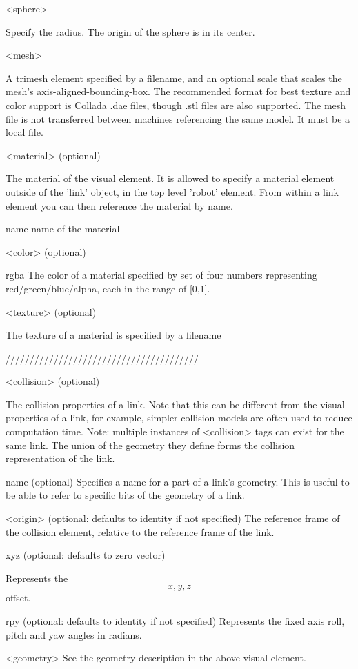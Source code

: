         <sphere>

            Specify the radius. The origin of the sphere is in its center. 

        <mesh>

            A trimesh element specified by a filename, and an optional scale that scales the mesh's axis-aligned-bounding-box. The recommended format for best texture and color support is Collada .dae files, though .stl files are also supported. The mesh file is not transferred between machines referencing the same model. It must be a local file. 

<material> (optional)

    The material of the visual element. It is allowed to specify a material element outside of the 'link' object, in the top level 'robot' element. From within a link element you can then reference the material by name.

    name name of the material

    <color> (optional)

        rgba The color of a material specified by set of four numbers representing red/green/blue/alpha, each in the range of [0,1]. 

    <texture> (optional)

        The texture of a material is specified by a filename     
            
////////////////////////////////////////




<collision> (optional)

    The collision properties of a link. Note that this can be different from the visual properties of a link, for example, simpler collision models are often used to reduce computation time. Note: multiple instances of <collision> tags can exist for the same link. The union of the geometry they define forms the collision representation of the link.

    name (optional)
        Specifies a name for a part of a link's geometry. This is useful to be able to refer to specific bits of the geometry of a link. 

    <origin> (optional: defaults to identity if not specified)
        The reference frame of the collision element, relative to the reference frame of the link.

        xyz (optional: defaults to zero vector)

            Represents the $$x,y,z$$ offset. 

        rpy (optional: defaults to identity if not specified)
            Represents the fixed axis roll, pitch and yaw angles in radians. 

    <geometry>
        See the geometry description in the above visual element. 
        